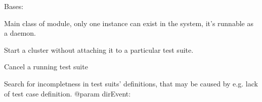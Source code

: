 \documentclass[letterpaper,10pt,english]{sphinxmanual}
\begin{document}
\begin{fulllineitems}
\label{ref-manual/XrdTestMaster:XrdTestMaster.XrdTestMaster}
Bases: {\hyperref[ref-manual/XrdTest:XrdTest.Daemon.Runnable]{}}

Main class of module, only one instance can exist in the system,
it's runnable as a daemon.

\begin{fulllineitems}
\label{ref-manual/XrdTestMaster:XrdTestMaster.XrdTestMaster.activateCluster}
Start a cluster without attaching it to a particular test suite.

\end{fulllineitems}


\begin{fulllineitems}
\label{ref-manual/XrdTestMaster:XrdTestMaster.XrdTestMaster.archiveSuiteSessions}
\end{fulllineitems}


\begin{fulllineitems}
\label{ref-manual/XrdTestMaster:XrdTestMaster.XrdTestMaster.cancelTestSuite}
Cancel a running test suite

\end{fulllineitems}


\begin{fulllineitems}
\label{ref-manual/XrdTestMaster:XrdTestMaster.XrdTestMaster.checkIfSuitsDefsComplete}
Search for incompletness in test suits' definitions, that may be caused
by e.g. lack of test case definition.
@param dirEvent:

\end{fulllineitems}



\end{fulllineitems}
\end{document}
